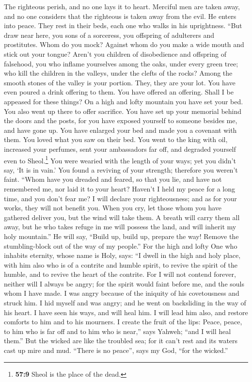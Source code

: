  The righteous perish, and no one lays it to heart.
Merciful men are taken away, and no one considers that the righteous is
taken away from the evil.  He enters into peace. They rest
in their beds, each one who walks in his uprightness. 
``But draw near here, you sons of a sorceress, you offspring of
adulterers and prostitutes.  Whom do you mock? Against
whom do you make a wide mouth and stick out your tongue? Aren't you
children of disobedience and offspring of falsehood,  you
who inflame yourselves among the oaks, under every green tree; who kill
the children in the valleys, under the clefts of the rocks?
 Among the smooth stones of the valley is your portion.
They, they are your lot. You have even poured a drink offering to them.
You have offered an offering. Shall I be appeased for these things?
 On a high and lofty mountain you have set your bed. You
also went up there to offer sacrifice.  You have set up
your memorial behind the doors and the posts, for you have exposed
yourself to someone besides me, and have gone up. You have enlarged your
bed and made you a covenant with them. You loved what you saw on their
bed.  You went to the king with oil, increased your
perfumes, sent your ambassadors far off, and degraded yourself even to
Sheol.\footnote{\textbf{57:9} Sheol is the place of the dead.}
 You were wearied with the length of your ways; yet you
didn't say, `It is in vain.' You found a reviving of your strength;
therefore you weren't faint.  ``Whom have you dreaded and
feared, so that you lie, and have not remembered me, nor laid it to your
heart? Haven't I held my peace for a long time, and you don't fear me?
 I will declare your righteousness; and as for your
works, they will not benefit you.  When you cry, let
those whom you have gathered deliver you, but the wind will take them. A
breath will carry them all away, but he who takes refuge in me will
possess the land, and will inherit my holy mountain.'' 
He will say, ``Build up, build up, prepare the way! Remove the
stumbling-block out of the way of my people.''  For the
high and lofty One who inhabits eternity, whose name is Holy, says: ``I
dwell in the high and holy place, with him also who is of a contrite and
humble spirit, to revive the spirit of the humble, and to revive the
heart of the contrite.  For I will not contend forever,
neither will I always be angry; for the spirit would faint before me,
and the souls whom I have made.  I was angry because of
the iniquity of his covetousness and struck him. I hid myself and was
angry; and he went on backsliding in the way of his heart.
 I have seen his ways, and will heal him. I will lead him
also, and restore comforts to him and to his mourners.  I
create the fruit of the lips: Peace, peace, to him who is far off and to
him who is near,'' says Yahweh; ``and I will heal them.''
 But the wicked are like the troubled sea; for it can't
rest and its waters cast up mire and mud.  ``There is no
peace'', says my God, ``for the wicked.''

